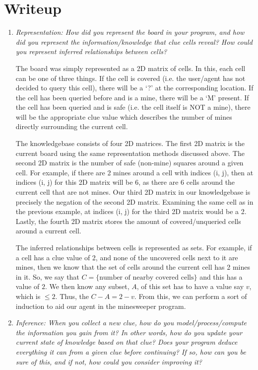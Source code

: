 \documentclass[12pt, twoside]{article}
\begin{document}
\section{Writeup}
\begin{enumerate}[itemsep=2mm,parsep=4mm]
    \item 
        \textit{Representation: How did you represent the board in your program, and how did you represent the information/knowledge that clue cells reveal? How could you represent inferred relationships between cells?}
    
        The board was simply represented as a 2D matrix of cells. In this, each cell can be one of three things. If the cell is covered (i.e. the user/agent has not decided to query this cell), there will be a `?' at the corresponding location. If the cell has been queried before and is a mine, there will be a `M' present. If the cell has been queried and is safe (i.e. the cell itself is NOT a mine), there will be the appropriate clue value which describes the number of mines directly surrounding the current cell. 

        The knowledgebase consists of four 2D matrices. The first 2D matrix is the current board using the same representation methods discussed above. The second 2D matrix is the number of safe (non-mine) squares around a given cell. For example, if there are 2 mines around a cell with indices (i, j), then at indices (i, j) for this 2D matrix will be 6, as there are 6 cells around the current cell that are not mines. Our third 2D matrix in our knowledgebase is precisely the negation of the second 2D matrix. Examining the same cell as in the previous example, at indices (i, j) for the third 2D matrix would be a 2. Lastly, the fourth 2D matrix stores the amount of covered/unqueried cells around a current cell.

        The inferred relationships between cells is represented as sets. For example, if a cell has a clue value of 2, and none of the uncovered cells next to it are mines, then we know that the set of cells around the current cell has 2 mines in it. So, we say that $C = \{\text{number of nearby covered cells}\}$ and this has a value of $2$. We then know any subset, $A$, of this set has to have a value say $v$, which is $\leq 2$. Thus, the $C - A = 2 - v$. From this, we can perform a sort of induction to aid our agent in the minesweeper program.

    \item 
        \textit{Inference: When you collect a new clue, how do you model/process/compute the information you gain from it? In other words, how do you update your current state of knowledge based on that clue? Does your program deduce everything it can from a given clue before continuing? If so, how can you be sure of this, and if not, how could you consider improving it?}
    

\end{enumerate}
\end{document}
